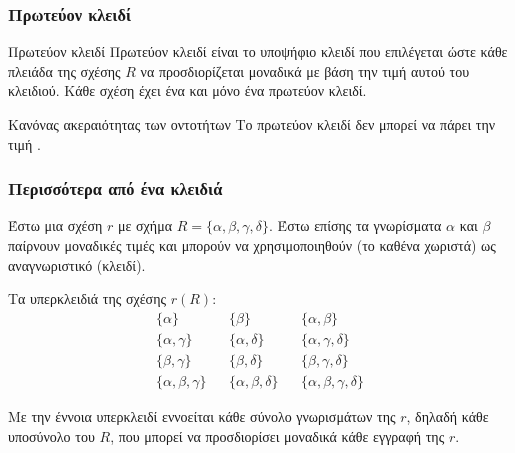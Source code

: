 \begin{frame}[t, fragile]
\frametitle{Πρωτεύον κλειδί}
\begin{minipage}{0.94\textwidth}
  \large
  \begin{block}{Πρωτεύον κλειδί}
    {\bb Πρωτεύον κλειδί} είναι το υποψήφιο κλειδί που επιλέγεται ώστε κάθε πλειάδα της σχέσης $R$ 
    να προσδιορίζεται μοναδικά με βάση την τιμή αυτού του κλειδιού. Κάθε σχέση έχει ένα
    {\cee και μόνο ένα} πρωτεύον κλειδί.
  \end{block}
  \begin{block}{Κανόνας ακεραιότητας των οντοτήτων}
    Το πρωτεύον κλειδί δεν μπορεί να πάρει την τιμή \tnull.
  \end{block}  
\end{minipage} 
\end{frame}



\begin{frame}
\frametitle{Περισσότερα από ένα κλειδιά}
Έστω μια σχέση $r$ με σχήμα $R = \{ \alpha, \beta, \gamma, \delta\}$.
Έστω επίσης τα γνωρίσματα $\alpha$ και $\beta$ παίρνουν μοναδικές τιμές και
μπορούν να χρησιμοποιηθούν (το καθένα χωριστά) ως αναγνωριστικό (κλειδί).
\begin{minipage}{0.94\textwidth}
Τα υπερκλειδιά της σχέσης $r(R)$:
  \begin{align*}
    \{\alpha\} & & \{\beta\} & & \{\alpha, \beta\} \\
    \{\alpha, \gamma\} & & \{\alpha, \delta\} & & \{\alpha, \gamma, \delta\} \\
    \{\beta, \gamma\} & & \{\beta, \delta\} & & \{\beta, \gamma, \delta\}   \\
    \{\alpha, \beta, \gamma\} & & \{\alpha, \beta, \delta\} & & \{\alpha, \beta, \gamma, \delta\}
  \end{align*}

Με την έννοια υπερκλειδί εννοείται κάθε σύνολο γνωρισμάτων της $r$, δηλαδή κάθε
υποσύνολο του $R$, που μπορεί να προσδιορίσει μοναδικά κάθε εγγραφή της $r$.
\end{minipage}
\end{frame}


